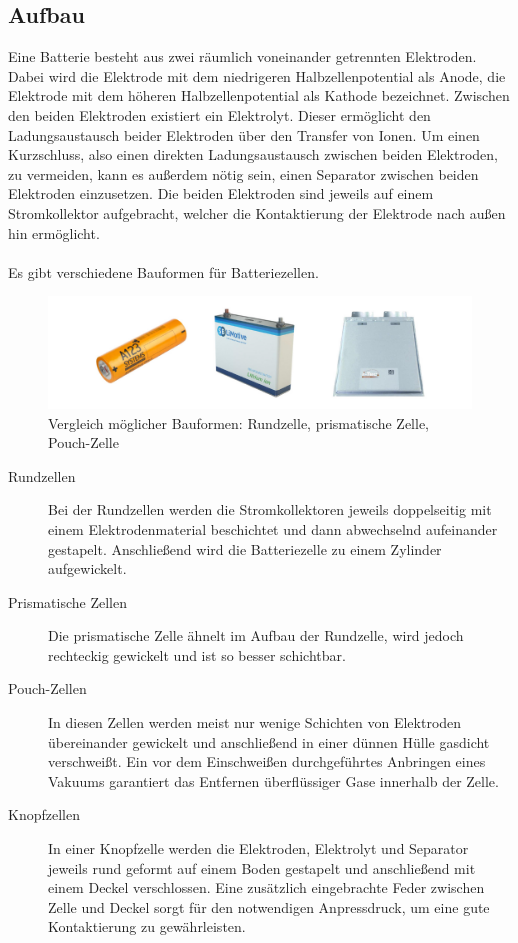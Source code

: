 \documentclass[a4paper, 11pt, headsepline,footsepline,twoside,abstract]{scrbook}
\begin{document}
\subsection{Aufbau}
Eine Batterie besteht aus zwei räumlich voneinander getrennten Elektroden. Dabei wird die Elektrode mit dem niedrigeren Halbzellenpotential als Anode, die Elektrode mit dem höheren Halbzellenpotential als Kathode bezeichnet. Zwischen den beiden Elektroden existiert ein Elektrolyt. Dieser ermöglicht den Ladungsaustausch beider Elektroden über den Transfer von Ionen. Um einen Kurzschluss, also einen direkten Ladungsaustausch zwischen beiden Elektroden, zu vermeiden, kann es außerdem nötig sein, einen Separator zwischen beiden Elektroden einzusetzen. Die beiden Elektroden sind jeweils auf einem Stromkollektor aufgebracht, welcher die Kontaktierung der Elektrode nach außen hin ermöglicht.
\\\\
Es gibt verschiedene Bauformen für Batteriezellen.
\begin{figure}
	\centering
	\includegraphics[width=1.0\columnwidth]{images/rund_prisma_pouch.jpg}
	\caption{Vergleich möglicher Bauformen: Rundzelle, prismatische Zelle, Pouch-Zelle}
	\label{vergleich_zellform}
\end{figure}
\begin{description}
\item[Rundzellen] Bei der Rundzellen werden die Stromkollektoren jeweils doppelseitig mit einem Elektrodenmaterial beschichtet und dann abwechselnd aufeinander gestapelt. Anschließend wird die Batteriezelle zu einem Zylinder aufgewickelt.
\item[Prismatische Zellen] Die prismatische Zelle ähnelt im Aufbau der Rundzelle, wird jedoch rechteckig gewickelt und ist so besser schichtbar.
\item[Pouch-Zellen] In diesen Zellen werden meist nur wenige Schichten von Elektroden übereinander gewickelt und anschließend in einer dünnen Hülle gasdicht verschweißt. Ein vor dem Einschweißen durchgeführtes Anbringen eines Vakuums garantiert das Entfernen überflüssiger Gase innerhalb der Zelle.
\item[Knopfzellen] In einer Knopfzelle werden die Elektroden, Elektrolyt und Separator jeweils rund geformt auf einem Boden gestapelt und anschließend mit einem Deckel verschlossen. Eine zusätzlich eingebrachte Feder zwischen Zelle und Deckel sorgt für den notwendigen Anpressdruck, um eine gute Kontaktierung zu gewährleisten.
\end{description}
\end{document}
